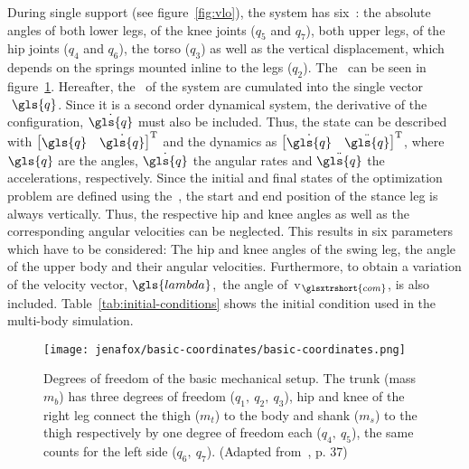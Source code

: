        During single support (see figure~\ref{fig:vlo}), the system has six~: the absolute angles of both lower legs, \ie of the knee joints ($q_5$ and $q_7$), both upper legs, \ie of the hip joints ($q_4$ and $q_6$), the torso ($q_3$) as well as the vertical displacement, which depends on the springs mounted inline to the legs ($q_2$). The~ can be seen in figure~\ref{fig:jenafox-dof}. Hereafter, the~ of the system are cumulated into the single vector$~\gls{q}$. Since it is a second order dynamical system, the derivative of the configuration, $\dot{\gls{q}}$ must also be included. Thus, the state can be described with$~\begin{bmatrix} \gls{q} & \dot{\gls{q}} \end{bmatrix}^\textrm{T}$ and the dynamics as$~\begin{bmatrix} \dot{\gls{q}} & \ddot{\gls{q}} \end{bmatrix}^\textrm{T}$, where $\gls{q}$ are the angles,$~\dot{\gls{q}}$ the angular rates and$~\ddot{\gls{q}}$ the accelerations, respectively. Since the initial and final states of the optimization problem are defined using the~, the start and end position of the stance leg is always vertically. Thus, the respective hip and knee angles as well as the corresponding angular velocities can be neglected. This results in six parameters which have to be considered: The hip and knee angles of the swing leg, the angle of the upper body and their angular velocities. Furthermore, to obtain a variation of the velocity vector,$~\gls{lambda}$,~\ie the angle of~\gls{v}$_{\glsxtrshort{com}}$, is also included. Table~\ref{tab:initial-conditions} shows the initial condition used in the multi-body simulation.
        
        \begin{figure}[htb]%
            \centering%
            \texttt{[image: jenafox/basic-coordinates/basic-coordinates.png]}
            \caption{Degrees of freedom of the basic mechanical setup. The trunk (mass $m_b$) has three degrees of freedom ($q_1,~q_2,~q_3$), hip and knee of the right leg connect the thigh ($m_t$) to the body and shank ($m_s$) to the thigh respectively by one degree of freedom each ($q_4,~q_5$), the same counts for the left side ($q_6,~q_7$). (Adapted from~\cite{Renjewski2013}, p. 37)}%
            \label{fig:jenafox-dof}%
        \end{figure}

